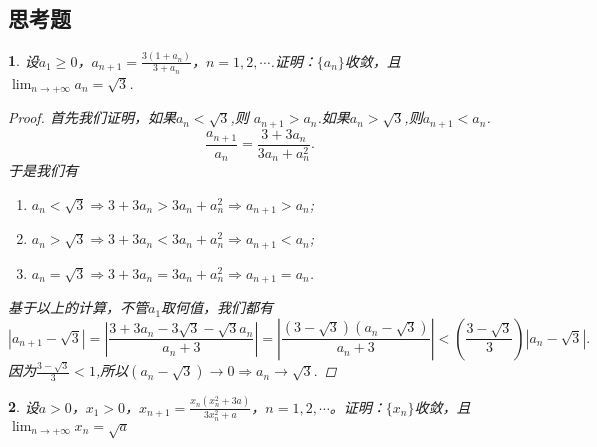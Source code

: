 \documentclass[utf8]{book}
\newtheorem{example}{}[section]             %
\begin{document}
\subsection{思考题}
\begin{example}
设$a_1\geq 0$，$a_{n+1} = \displaystyle\frac{3(1+a_n)}{3+a_n}$，$n=1,2,\cdots$.证明：$\{a_n\}$收敛，且$\displaystyle  \lim_{n\to +\infty}a_n=\sqrt{3}$.
\begin{proof}
首先我们证明，如果$a_n < \sqrt{3}$,则 $a_{n+1} > a_{n}$.如果$a_n > \sqrt{3}$,则$a_{n+1} < a_{n}$. 
$$\displaystyle \frac{a_{n+1}}{a_n} = \frac{3 + 3a_n}{3a_n + a_n^2}.$$
于是我们有
\renewcommand\labelenumi{\normalfont(\theenumi)}
\begin{enumerate}
\item $a_n < \sqrt{3}\Rightarrow 3 + 3a_n > 3a_n + a_n^2 \Rightarrow  a_{n+1}>a_{n}$;
\item $a_n > \sqrt{3}\Rightarrow 3 + 3a_n < 3a_n + a_n^2 \Rightarrow  a_{n+1}< a_{n}$;
\item $a_n = \sqrt{3}\Rightarrow 3 + 3a_n = 3a_n + a_n^2 \Rightarrow  a_{n+1}= a_{n}$.
\end{enumerate}
基于以上的计算，不管$a_1$取何值，我们都有
$$\left|a_{n+1}-\sqrt{3}\right| = \left|\frac{3+3a_n - 3\sqrt{3} -\sqrt{3}a_n}{a_n+3}\right|=\left|\frac{(3-\sqrt{3})(a_n-\sqrt{3})}{a_n+3}\right|<\left(\frac{3-\sqrt{3}}{3}\right)\left| a_n-\sqrt{3}\right|.$$
因为$\displaystyle \frac{3-\sqrt{3}}{3} < 1$,所以$(a_n-\sqrt{3})\rightarrow 0 \Rightarrow a_n\rightarrow \sqrt{3}.$
\end{proof}
\end{example}
\begin{example}
设$a>0$，$x_1>0$，$x_{n+1} = \displaystyle\frac{x_n(x_n^2+3a)}{3x_n^2+a}$，$n=1,2,\cdots$。证明：$\{x_n\}$收敛，且$\displaystyle  \lim_{n\to +\infty}x_n=\sqrt{a}$
\end{example}
\end{document}
